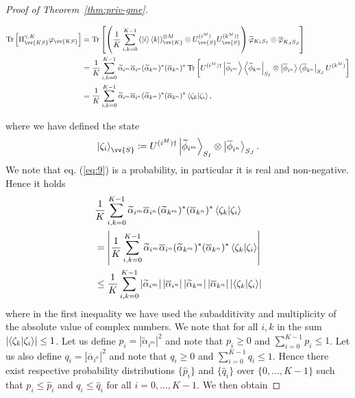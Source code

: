 \documentclass[aps,pra,twocolumn,superscriptaddress,longbibliography]{revtex4-1}
\def\Tr{\operatorname{Tr}}
\def\({\left(}
\def\){\right)}
\begin{document}
\begin{appendix}
\begin{proof}[Proof of Theorem~\ref{thm:priv-gme}]
\begin{widetext}
\begin{align}
\Tr\left[\Pi^{\gamma,K}_{\vv{KS}}\varphi_{\vv{KS}}\right]
&=\Tr\left[\(\frac{1}{K}\sum_{i,k=0}^{K-1}\(\ket{i}\bra{k}\)^{\otimes M}_{\vv{K}}\otimes U_{\vv{S}}^{(i^M)}U_{\vv{S}}^{(k^M)\dag}\)\widetilde\varphi_{K_IS_I}\otimes\overline\varphi_{K_JS_J}\right]\\
&=\frac{1}{K}\sum_{i,k=0}^{K-1}\widetilde{\alpha}_{i^{m}}\overline{\alpha}_{i^{n}}(\widetilde{\alpha}_{k^{m}})^*(\overline{\alpha}_{k^{n}})^*\Tr\left[U^{(i^M)\dag}\ket{\widetilde{\phi}_{i^m}}\bra{\widetilde{\phi}_{k^m}}_{S_I}\otimes\ket{\overline{\phi}_{i^n}}\bra{\overline{\phi}_{k^n}}_{S_J}U^{(k^M)}\right]\\
&=\frac{1}{K}\sum_{i,k=0}^{K-1}\widetilde{\alpha}_{i^m}\overline{\alpha}_{i^n}(\widetilde{\alpha}_{k^m})^*(\overline{\alpha}_{k^n})^*\bra{\zeta_k}\ket{\zeta_i},\label{eq:9}
\end{align}
\end{widetext}
where we have defined the state
\begin{equation}
\ket{\zeta_i}_{\vv{S}} \coloneqq U^{(i^M)\dag}\ket{\widetilde{\phi}_{i^m}}_{S_I}\otimes\ket{\overline{\phi}_{i^n}}_{S_J}.
\end{equation}
We note that eq. (\ref{eq:9}) is a probability, in particular it is real and non-negative. Hence it holds
\begin{align}
&\frac{1}{K}\sum_{i,k=0}^{K-1}\widetilde{\alpha}_{i^m}\overline{\alpha}_{i^n}(\widetilde{\alpha}_{k^m})^*(\overline{\alpha}_{k^n})^*\bra{\zeta_k}\ket{\zeta_i}\\
&=\left|\frac{1}{K}\sum_{i,k=0}^{K-1}\widetilde{\alpha}_{i^m}\overline{\alpha}_{i^n}(\widetilde{\alpha}_{k^m})^*(\overline{\alpha}_{k^n})^*\bra{\zeta_k}\ket{\zeta_i}\right|\\
&\leq\frac{1}{K}\sum_{i,k=0}^{K-1}\left|\widetilde{\alpha}_{i^m}\right|\left|\overline{\alpha}_{i^n}\right|\left|\widetilde{\alpha}_{k^m}\right|\left|\overline{\alpha}_{k^n}\right|\left|\bra{\zeta_k}\ket{\zeta_i}\right|
\end{align}
where in the first inequality we have used the subadditivity and multiplicity of the absolute value of complex numbers. We note that for all $i,k$ in the sum $\left|\bra{\zeta_k}\ket{\zeta_i}\right|\leq 1$. Let us define $p_i=\left|\widetilde{\alpha}_{i^m}\right|^2$ and note that $p_i\geq0$ and $\sum_{i=0}^{K-1}p_i\leq1$. Let us also define $q_i=\left|\overline{\alpha}_{i^n}\right|^2$ and note that $q_i\geq0$ and $\sum_{i=0}^{K-1}q_i\leq1$. Hence there exist respective probability distributions $\{\hat{p}_i\}$ and $\{\hat{q}_i\}$ over $\{0,...,K-1\}$ such that $p_i\leq\hat{p}_i$ and $q_i\leq\hat{q}_i$ for all $i=0,...,K-1$. We then obtain

\end{proof}
\end{appendix}
\end{document}
